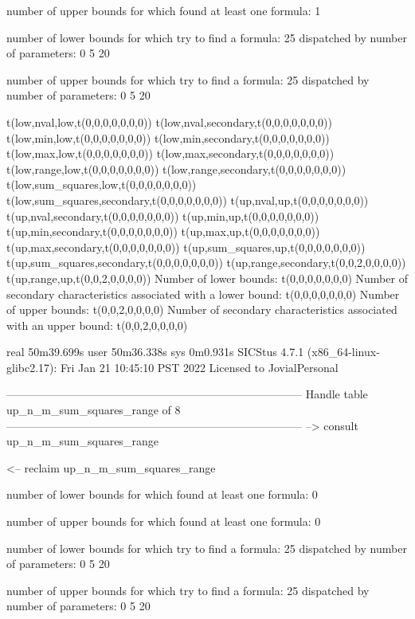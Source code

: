 number of upper bounds for which found at least one formula: 1

number of lower bounds for which try to find a formula: 25
dispatched by number of parameters: 0  5  20

number of upper bounds for which try to find a formula: 25
dispatched by number of parameters: 0  5  20

t(low,nval,low,t(0,0,0,0,0,0,0))
t(low,nval,secondary,t(0,0,0,0,0,0,0))
t(low,min,low,t(0,0,0,0,0,0,0))
t(low,min,secondary,t(0,0,0,0,0,0,0))
t(low,max,low,t(0,0,0,0,0,0,0))
t(low,max,secondary,t(0,0,0,0,0,0,0))
t(low,range,low,t(0,0,0,0,0,0,0))
t(low,range,secondary,t(0,0,0,0,0,0,0))
t(low,sum_squares,low,t(0,0,0,0,0,0,0))
t(low,sum_squares,secondary,t(0,0,0,0,0,0,0))
t(up,nval,up,t(0,0,0,0,0,0,0))
t(up,nval,secondary,t(0,0,0,0,0,0,0))
t(up,min,up,t(0,0,0,0,0,0,0))
t(up,min,secondary,t(0,0,0,0,0,0,0))
t(up,max,up,t(0,0,0,0,0,0,0))
t(up,max,secondary,t(0,0,0,0,0,0,0))
t(up,sum_squares,up,t(0,0,0,0,0,0,0))
t(up,sum_squares,secondary,t(0,0,0,0,0,0,0))
t(up,range,secondary,t(0,0,2,0,0,0,0))
t(up,range,up,t(0,0,2,0,0,0,0))
Number of lower bounds:                                             t(0,0,0,0,0,0,0)
Number of secondary characteristics associated with a lower bound:  t(0,0,0,0,0,0,0)
Number of upper bounds:                                             t(0,0,2,0,0,0,0)
Number of secondary characteristics associated with an upper bound: t(0,0,2,0,0,0,0)

real	50m39.699s
user	50m36.338s
sys	0m0.931s
SICStus 4.7.1 (x86_64-linux-glibc2.17): Fri Jan 21 10:45:10 PST 2022
Licensed to JovialPersonal


--------------------------------------------------------------------------------
Handle table up_n_m_sum_squares_range of 8
--------------------------------------------------------------------------------
--> consult up_n_m_sum_squares_range

<-- reclaim up_n_m_sum_squares_range

number of lower bounds for which found at least one formula: 0

number of upper bounds for which found at least one formula: 0

number of lower bounds for which try to find a formula: 25
dispatched by number of parameters: 0  5  20

number of upper bounds for which try to find a formula: 25
dispatched by number of parameters: 0  5  20

